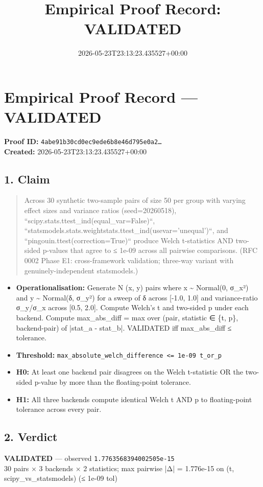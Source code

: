 \documentclass{article}
\title{Empirical Proof Record: VALIDATED}
\date{2026-05-23T23:13:23.435527+00:00}
\begin{document}
\maketitle
\section*{Empirical Proof Record --- \textcolor{validated}{\textbf{VALIDATED}}}
\textbf{Proof ID:} \texttt{4abe91b30cd0ec9ede6b8e46d795e0a2\dots}\\
\textbf{Created:} 2026-05-23T23:13:23.435527+00:00
\subsection*{1. Claim}
\begin{quote}Across 30 synthetic two-sample pairs of size 50 per group with varying effect sizes and variance ratios (seed=20260518), ``scipy.stats.ttest\_ind(equal\_var=False)``, ``statsmodels.stats.weightstats.ttest\_ind(usevar='unequal')``, and ``pingouin.ttest(correction=True)`` produce Welch t-statistics AND two-sided p-values that agree to ≤ 1e-09 across all pairwise comparisons. (RFC 0002 Phase E1: cross-framework validation; three-way variant with genuinely-independent statsmodels.)\end{quote}
\begin{itemize}
\item \textbf{Operationalisation:} Generate N (x, y) pairs where x \textasciitilde{} Normal(0, σ\_x²) and y \textasciitilde{} Normal(δ, σ\_y²) for a sweep of δ across [-1.0, 1.0] and variance-ratio σ\_y/σ\_x across [0.5, 2.0]. Compute Welch's t and two-sided p under each backend. Compute max\_abs\_diff = max over (pair, statistic ∈ \{t, p\}, backend-pair) of |stat\_a - stat\_b|. VALIDATED iff max\_abs\_diff ≤ tolerance.
\item \textbf{Threshold:} \texttt{max\_absolute\_welch\_difference <= 1e-09 t\_or\_p}
\item \textbf{H0:} At least one backend pair disagrees on the Welch t-statistic OR the two-sided p-value by more than the floating-point tolerance.
\item \textbf{H1:} All three backends compute identical Welch t AND p to floating-point tolerance across every pair.
\end{itemize}
\subsection*{2. Verdict}
\textcolor{validated}{\textbf{VALIDATED}} --- observed \texttt{1.7763568394002505e-15}\\
30 pairs × 3 backends × 2 statistics; max pairwise |Δ| = 1.776e-15 on (t, scipy\_vs\_statsmodels) (≤ 1e-09 tol)
\end{document}
